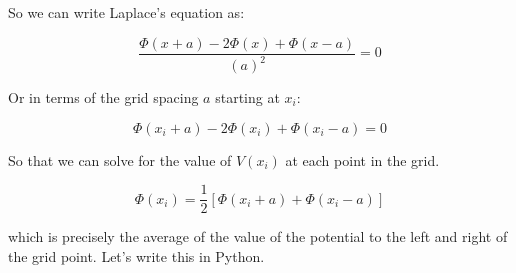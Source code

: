 So we can write Laplace's equation as:

\[\frac{\Phi(x+a)-2\Phi(x)+\Phi(x-a)}{(a)^2}=0\]

Or in terms of the grid spacing \(a\) starting at \(x_i\):

\[\Phi(x_i+a)-2\Phi(x_i)+\Phi(x_i-a)=0\]

So that we can solve for the value of \(V(x_i)\) at each point in the
grid.

\[\Phi(x_i)=\frac{1}{2}\left[\Phi(x_i+a)+\Phi(x_i-a)\right]\]

which is precisely the average of the value of the potential to the left
and right of the grid point. Let's write this in Python.

\begin{Shaded}
\begin{Highlighting}[]
\end{Highlighting}
\end{Shaded}

